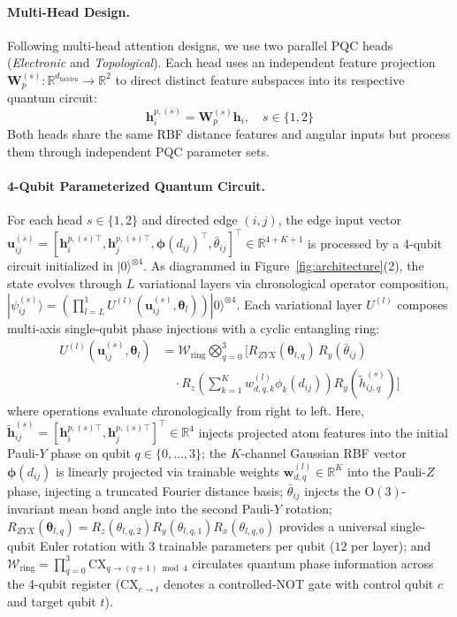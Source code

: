 \documentclass[10pt,twocolumn,letterpaper]{article}
\begin{document}
\paragraph{Multi-Head Design.}
Following multi-head attention designs, we use two parallel PQC heads (\textit{Electronic} and \textit{Topological}). Each head uses an independent feature projection $\mathbf{W}_p^{(s)}: \mathbb{R}^{d_{\mathrm{hidden}}} \to \mathbb{R}^2$ to direct distinct feature subspaces into its respective quantum circuit:
\begin{equation}
    \mathbf{h}_i^{p,(s)} = \mathbf{W}_p^{(s)} \mathbf{h}_i, \quad s \in \{1, 2\}
\end{equation}
Both heads share the same RBF distance features and angular inputs but process them through independent PQC parameter sets.

\paragraph{4-Qubit Parameterized Quantum Circuit.}
For each head $s \in \{1, 2\}$ and directed edge $(i, j)$, the edge input vector $\mathbf{u}_{ij}^{(s)} = [\mathbf{h}_i^{p,(s)\top}, \mathbf{h}_j^{p,(s)\top}, \boldsymbol{\phi}(d_{ij})^\top, \bar{\theta}_{ij}]^\top \in \mathbb{R}^{4+K+1}$ is processed by a 4-qubit circuit initialized in $|0\rangle^{\otimes 4}$. As diagrammed in Figure~\ref{fig:architecture}(2), the state evolves through $L$ variational layers via chronological operator composition, $|\psi_{ij}^{(s)}\rangle = \left(\prod_{l=L}^1 U^{(l)}(\mathbf{u}_{ij}^{(s)}, \boldsymbol{\theta}_l)\right) |0\rangle^{\otimes 4}$. Each variational layer $U^{(l)}$ composes multi-axis single-qubit phase injections with a cyclic entangling ring:
\begin{align}
    U^{(l)}(\mathbf{u}_{ij}^{(s)}, \boldsymbol{\theta}_l) &= \mathcal{W}_{\mathrm{ring}} \bigotimes_{q=0}^3 \Big[ R_{ZYX}(\boldsymbol{\theta}_{l,q}) \, R_y(\bar{\theta}_{ij}) \nonumber \\
    &\quad \cdot R_z\!\left(\sum_{k=1}^K w_{d,q,k}^{(l)} \phi_k(d_{ij})\right) R_y(\tilde{h}_{ij,q}^{(s)}) \Big]
    \label{eq:layer_unitary}
\end{align}
where operations evaluate chronologically from right to left. Here, $\tilde{\mathbf{h}}_{ij}^{(s)} = [\mathbf{h}_i^{p,(s)\top}, \mathbf{h}_j^{p,(s)\top}]^\top \in \mathbb{R}^4$ injects projected atom features into the initial Pauli-$Y$ phase on qubit $q \in \{0, \dots, 3\}$; the $K$-channel Gaussian RBF vector $\boldsymbol{\phi}(d_{ij})$ is linearly projected via trainable weights $\mathbf{w}_{d,q}^{(l)} \in \mathbb{R}^K$ into the Pauli-$Z$ phase, injecting a truncated Fourier distance basis; $\bar{\theta}_{ij}$ injects the $\mathrm{O}(3)$-invariant mean bond angle into the second Pauli-$Y$ rotation; $R_{ZYX}(\boldsymbol{\theta}_{l,q}) = R_z(\theta_{l,q,2}) R_y(\theta_{l,q,1}) R_x(\theta_{l,q,0})$ provides a universal single-qubit Euler rotation with 3 trainable parameters per qubit ($12$ per layer); and $\mathcal{W}_{\mathrm{ring}} = \prod_{q=0}^3 \mathrm{CX}_{q \to (q+1)\bmod 4}$ circulates quantum phase information across the 4-qubit register ($\mathrm{CX}_{c \to t}$ denotes a controlled-NOT gate with control qubit $c$ and target qubit $t$).
\end{document}
